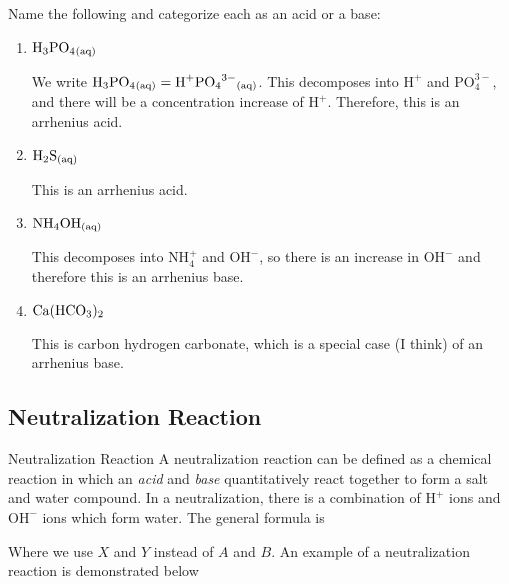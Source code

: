 \documentclass[12pt]{report}
\begin{document}
\begin{+problems}
\item{Name the following and categorize each as an acid or a base:}
    \begin{enumerate}[label=(\alph*)]
     \item{ $\ce{H3PO4_{(aq)}}$}
        \begin{solution}
            We write $\ce{H3PO4_{(aq)}}= \text{H}^{+} \ce{PO4^{3-}_{(aq)}}$. This decomposes into $\text{H}^{+}$ and $\text{PO}^{3-}_{4}$, and there will be a concentration increase of $\text{H}^{+}$. Therefore, this is an arrhenius acid. 
        \end{solution}

    \item{ $\ce{H2S_{(aq)}}$}
        \begin{solution}
            This is an arrhenius acid.
        \end{solution}
    \item{ $\ce{NH4OH_{(aq)}}$}
        \begin{solution}
            This decomposes into $\text{NH}^{+}_{4}$ and $\text{OH}^{-}$, so there is an increase in $\text{OH}^{-}$ and therefore this is an arrhenius base. 
        \end{solution}
    \item{ $\ce{Ca(HCO3)2}$}
        \begin{solution}
            This is carbon hydrogen carbonate, which is a special case (I think) of an arrhenius base. 
        \end{solution}
    \end{enumerate}
\end{+problems}

\subsection{Neutralization Reaction}
\begin{definition}{Neutralization Reaction}
A neutralization reaction can be defined as a chemical reaction in which an \textit{acid} and \textit{base} quantitatively react together to form a salt and water compound. In a neutralization, there is a combination of $ \text{H}^{+}$ ions and $ \text{OH}^{-}$ ions which form water. The general formula is 
\begin{center}
\end{center}
Where we use $X$ and $Y$ instead of $A$ and $B$. An example of a neutralization reaction is demonstrated below 
\end{definition}
\end{document}
